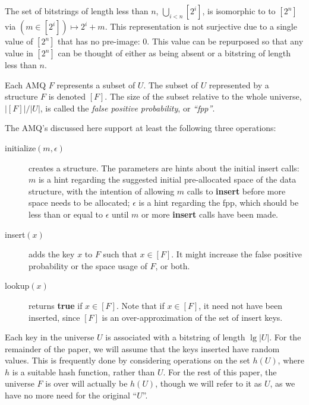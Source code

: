 \documentclass[letterpaper]{article}
\begin{document}
The set of bitstrings of length less than $n$,  $\bigcup_{i < n} [2^i]$, is isomorphic to to $[2^n]$ via $(m \in [2^i]) \mapsto 2^i + m$.
This representation is not surjective due to a single value of $[2^n]$ that has no pre-image: $0$.
This value can be repurposed so that any value in $[2^n]$ can be thought of either as being absent or a bitstring of length less than $n$.

Each AMQ $F$ represents a subset of $U$.
The subset of $U$ represented by a structure $F$ is denoted $[F]$.
The size of the subset relative to the whole universe, $|[F]|/|U|$, is called the {\em false positive probability}, or {\em ``fpp''}.

The AMQ's discussed here support at least the following three operations:

\begin{description}
\item[initialize$(m, \epsilon)$] creates a structure.
  The parameters are hints about the initial insert calls:
  $m$ is a hint regarding the suggested initial pre-allocated space of the data structure, with the intention of allowing $m$ calls to {\bf insert} before more space needs to be allocated;
  $\epsilon$ is a hint regarding the fpp, which should be less than or equal to $\epsilon$ until $m$ or more {\bf insert} calls have been made.
\item[insert$(x)$] adds the key $x$ to $F$ such that $x \in [F]$.
  It might increase the false positive probability or the space usage of $F$, or both.
\item[lookup$(x)$] returns {\bf true} if $x \in [F]$.
  Note that if $x \in [F]$, it need not have been inserted, since $[F]$ is an over-approximation of the set of insert keys.
\end{description}

Each key in the universe $U$ is associated with a bitstring of length $\lg |U|$.
For the remainder of the paper, we will assume that the keys inserted have random values.
This is frequently done by considering operations on the set $h(U)$, where $h$ is a suitable hash function, rather than $U$.
For the rest of this paper, the universe $F$ is over will actually be $h(U)$, though we will refer to it as $U$, as we have no more need for the original ``$U$''.
\end{document}
